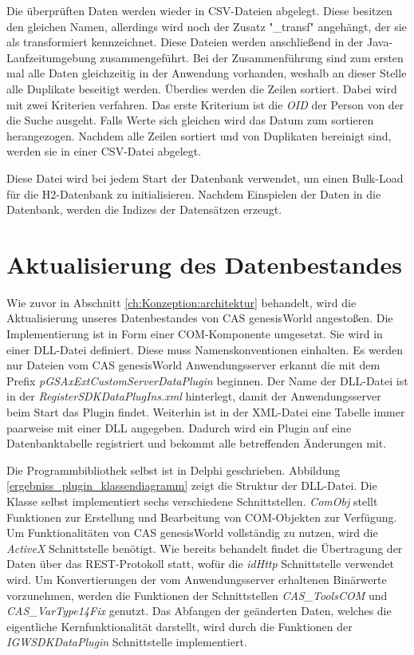 Die überprüften Daten werden wieder in CSV-Dateien abgelegt. Diese besitzen den gleichen Namen, allerdings wird noch der Zusatz "\_transf" angehängt, der sie als transformiert kennzeichnet. Diese Dateien werden anschließend in der Java-Laufzeitumgebung zusammengeführt. Bei der Zusammenführung sind zum ersten mal alle Daten gleichzeitig in der Anwendung vorhanden, weshalb an dieser Stelle alle Duplikate beseitigt werden. Überdies werden die Zeilen sortiert. Dabei wird mit zwei Kriterien verfahren. Das erste Kriterium ist die \textit{OID} der Person von der die Suche ausgeht. Falls Werte sich gleichen wird das Datum zum sortieren herangezogen. Nachdem alle Zeilen sortiert und von Duplikaten bereinigt sind, werden sie in einer CSV-Datei abgelegt. 

Diese Datei wird bei jedem Start der Datenbank verwendet, um einen Bulk-Load für die H2-Datenbank zu initialisieren. Nachdem Einspielen der Daten in die Datenbank, werden die Indizes der Datensätzen erzeugt.

\section{Aktualisierung des Datenbestandes}

Wie zuvor in Abschnitt \ref{ch:Konzeption:architektur} behandelt, wird die Aktualisierung unseres Datenbestandes von CAS genesisWorld angestoßen. Die Implementierung ist in Form einer COM-Komponente umgesetzt. Sie wird in einer DLL-Datei definiert. Diese muss Namenskonventionen einhalten. Es werden nur Dateien vom CAS genesisWorld Anwendungsserver erkannt die mit dem Prefix \textit{pGSAxExtCustomServerDataPlugin} beginnen. Der Name der DLL-Datei ist in der \textit{RegisterSDKDataPlugIns.xml} hinterlegt, damit der Anwendungsserver beim Start das Plugin findet. Weiterhin ist in der XML-Datei eine Tabelle immer paarweise mit einer DLL angegeben. Dadurch wird ein Plugin auf eine Datenbanktabelle registriert und bekommt alle betreffenden Änderungen mit.

Die Programmbibliothek selbst ist in Delphi geschrieben. Abbildung \ref{ergebniss_plugin_klassendiagramm} zeigt die Struktur der DLL-Datei. Die Klasse selbst implementiert sechs verschiedene Schnittstellen. \textit{ComObj} stellt Funktionen zur Erstellung und Bearbeitung von COM-Objekten zur Verfügung. Um Funktionalitäten von CAS genesisWorld vollständig zu nutzen, wird die \textit{ActiveX} Schnittstelle benötigt. Wie bereits behandelt findet die Übertragung der Daten über das REST-Protokoll statt, wofür die \textit{idHttp} Schnittstelle verwendet wird. Um Konvertierungen der vom Anwendungsserver erhaltenen Binärwerte vorzunehmen, werden die Funktionen der Schnittstellen \textit{CAS\_ToolsCOM} und \textit{CAS\_VarType14Fix} genutzt. Das Abfangen der geänderten Daten, welches die eigentliche Kernfunktionalität darstellt, wird durch die Funktionen der \textit{IGWSDKDataPlugin} Schnittstelle implementiert.

